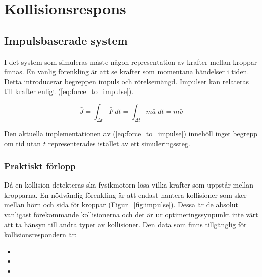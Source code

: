 \documentclass[a4paper,12pt,twopage,swedish]{article}
\begin{document}



\section{Kollisionsrespons}
\subsection{Impulsbaserade system}
I det system som simuleras måste någon representation av krafter mellan kroppar finnas. En vanlig förenkling är att se krafter som momentana händelser i tiden. Detta introducerar begreppen impuls och rörelsemängd. Impulser kan relateras till krafter enligt (\ref{eq:force_to_impulse}).

\begin{equation}\label{eq:force_to_impulse}
\bar{J} = \int_{\Delta t}^{} \bar{F} \ dt = \int_{\Delta t}^{} m\bar{a} \ dt = m\bar{v}
\end{equation}

Den aktuella implementationen av (\ref{eq:force_to_impulse}) innehöll inget begrepp om tid utan $t$ representerades istället av ett simuleringssteg.

\subsubsection{Praktiskt förlopp}
Då en kollision detekteras ska fysikmotorn lösa vilka krafter som uppstår mellan kropparna. En nödvändig förenkling är att endast hantera kollisioner som sker mellan hörn och sida för kroppar (Figur ~\ref{fig:impulse}). Dessa är de absolut vanligast förekommande kollisionerna och det är ur optimeringssynpunkt inte värt att ta hänsyn till andra typer av kollisioner. Den data som finns tillgänglig för kollisionsrespondern är:

\begin{itemize}
\item {}
\item {}
\item {}
\end{itemize}
\end{document}

